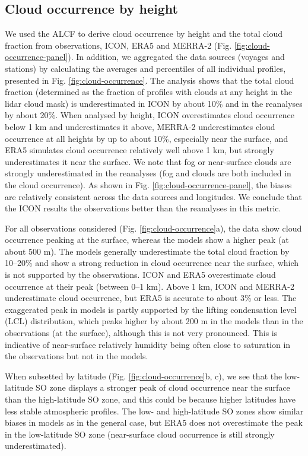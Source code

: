 \documentclass[draft]{agujournal2019}
\begin{document}
\subsection{Cloud occurrence by height}
\label{sec:cloud-occurrence}

We used the ALCF to derive cloud occurrence by height and the total cloud
fraction from observations, ICON, ERA5 and MERRA-2 (Fig.
\ref{fig:cloud-occurrence-panel}). In addition, we aggregated the data sources
(voyages and stations) by calculating the averages and percentiles of all
individual profiles, presented in Fig. \ref{fig:cloud-occurrence}. The analysis
shows that the total cloud fraction (determined as the fraction of profiles
with clouds at any height in the lidar cloud mask) is underestimated in ICON by
about 10\% and in the reanalyses by about 20\%. When analysed by height, ICON
overestimates cloud occurrence below 1 km and underestimates it above, MERRA-2
underestimates cloud occurrence at all heights by up to about 10\%, especially
near the surface, and ERA5 simulates cloud occurrence relatively well above 1
km, but strongly underestimates it near the surface.  We note that fog or
near-surface clouds are strongly underestimated in the reanalyses (fog and
clouds are both included in the cloud occurrence).  As shown in Fig.
\ref{fig:cloud-occurrence-panel}, the biases are relatively consistent across
the data sources and longitudes. We conclude that the ICON results  the
observations better than the reanalyses in this metric.

For all observations considered (Fig. \ref{fig:cloud-occurrence}a), the data
show cloud occurrence peaking at the surface, whereas the models show a higher
peak (at about 500 m). The models generally underestimate the total cloud
fraction by 10--20\% and show a strong reduction in cloud occurrence near the
surface, which is not supported by the observations. ICON and ERA5 overestimate
cloud occurrence at their peak (between 0--1 km). Above 1 km, ICON and MERRA-2
underestimate cloud occurrence, but ERA5 is accurate to about 3\% or less. The
exaggerated peak in models is partly supported by the lifting condensation
level (LCL) distribution, which peaks higher by about 200 m in the models than
in the observations (at the surface), although this is not very pronounced.
This is indicative of near-surface relatively humidity being often close to
saturation in the observations but not in the models.

When subsetted by latitude (Fig.  \ref{fig:cloud-occurrence}b, c), we see that
the low-latitude SO zone displays a stronger peak of cloud occurrence near the
surface than the high-latitude SO zone, and this could be because higher
latitudes have less stable atmospheric profiles. The low- and high-latitude SO
zones show similar biases in models as in the general case, but ERA5 does not
overestimate the peak in the low-latitude SO zone (near-surface cloud
occurrence is still strongly underestimated).
\end{document}
